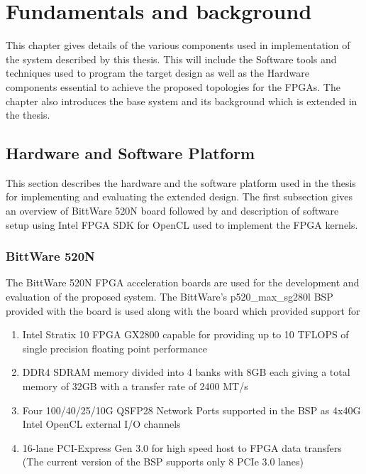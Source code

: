 \chapter{Fundamentals and background}
\label{cha:Fundamentals}

This chapter gives details of the various components used in implementation
of the system described by this thesis. This will include the Software
tools and techniques used to program the target design as well as the Hardware
components essential to achieve the proposed topologies for the FPGAs. The chapter
also introduces the base system and its background which is extended in the thesis.

\section{Hardware and Software Platform}

This section describes the hardware and the software platform used in the
thesis for implementing and evaluating the extended design. The first subsection
gives an overview of BittWare 520N board followed by and description of software
setup using Intel FPGA SDK for OpenCL used to implement the FPGA kernels.

\subsection{BittWare 520N}

The BittWare 520N FPGA acceleration boards are used for the development
and evaluation of the proposed system. The BittWare's p520\_max\_sg280l BSP
provided with the board is used along with the board which provided support for
\begin{enumerate}
    \item Intel Stratix 10 FPGA GX2800 capable for providing up to 10 TFLOPS of single
    precision floating point performance
    \item DDR4 SDRAM memory divided into 4 banks with 8GB each giving a total memory of 32GB with
    a transfer rate of 2400 MT/s
    \item Four 100/40/25/10G QSFP28 Network Ports supported in the
    BSP as 4x40G Intel OpenCL external I/O channels
    \item 16-lane PCI-Express Gen 3.0 for high speed host to FPGA data transfers (The current version of
    the BSP supports only 8 PCIe 3.0 lanes)
\end{enumerate}

